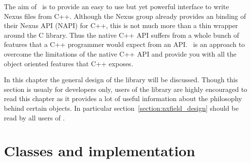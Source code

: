 
The aim of \pninx\ is to provide an easy to use but yet powerful interface
to write Nexus files from C++. Although the Nexus group already provides 
an binding of their Nexus API (NAPI) for C++, this is not much more than a 
thin wrapper around the C library. Thus the native C++ API suffers from 
a whole bunch of features that a C++ programmer would expect from an API. 
\pninx\ is an approach to overcome the limitations of the native C++ API 
and provide you with all the object oriented features that C++ exposes.

In this chapter the general design of the library will be discussed. 
Though this section is usualy for developers only, users of the library 
are highly encouraged to read this chapter as it provides a lot of useful 
information about the philosophy behind certain objects. In particular 
section~\ref{section:nxfield_design} should be read by all users of \pninx. 

\section{Classes and implementation}\label{section:classes_implementation}

